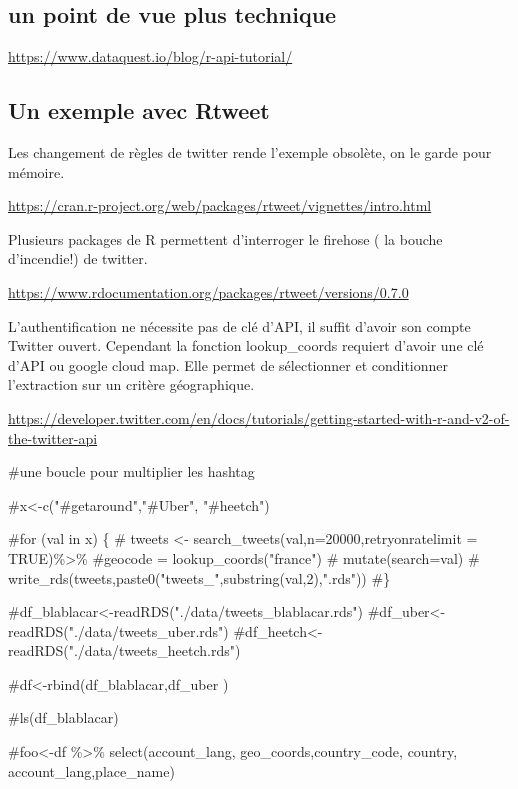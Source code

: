 \documentclass[
  letterpaper,
  DIV=11,
  numbers=noendperiod]{scrreprt}
\newenvironment{Shaded}{\begin{snugshade}}{\end{snugshade}}
\newcommand{\CommentTok}[1]{\textcolor[rgb]{0.37,0.37,0.37}{#1}}
\begin{document}
\subsection{un point de vue plus
technique}\label{un-point-de-vue-plus-technique}

\url{https://www.dataquest.io/blog/r-api-tutorial/}

\subsection{Un exemple avec Rtweet}\label{un-exemple-avec-rtweet}

Les changement de règles de twitter rende l'exemple obsolète, on le
garde pour mémoire.

\url{https://cran.r-project.org/web/packages/rtweet/vignettes/intro.html}

Plusieurs packages de R permettent d'interroger le firehose ( la bouche
d'incendie!) de twitter.

\url{https://www.rdocumentation.org/packages/rtweet/versions/0.7.0}

L'authentification ne nécessite pas de clé d'API, il suffit d'avoir son
compte Twitter ouvert. Cependant la fonction lookup\_coords requiert
d'avoir une clé d'API ou google cloud map. Elle permet de sélectionner
et conditionner l'extraction sur un critère géographique.

\url{https://developer.twitter.com/en/docs/tutorials/getting-started-with-r-and-v2-of-the-twitter-api}

\begin{Shaded}
\begin{Highlighting}[]
\CommentTok{\#une boucle pour multiplier les hashtag }

\CommentTok{\#x\textless{}{-}c("\#getaround","\#Uber", "\#heetch")}

\CommentTok{\#for (val in x) \{}
\CommentTok{\#  tweets \textless{}{-} search\_tweets(val,n=20000,retryonratelimit = TRUE)\%\textgreater{}\% \#geocode = lookup\_coords("france")}
\CommentTok{\#      mutate(search=val)}
\CommentTok{\#  write\_rds(tweets,paste0("tweets\_",substring(val,2),".rds"))}
\CommentTok{\#\}}

\CommentTok{\#df\_blablacar\textless{}{-}readRDS("./data/tweets\_blablacar.rds")}
\CommentTok{\#df\_uber\textless{}{-}readRDS("./data/tweets\_uber.rds")}
\CommentTok{\#df\_heetch\textless{}{-}readRDS("./data/tweets\_heetch.rds")}

\CommentTok{\#df\textless{}{-}rbind(df\_blablacar,df\_uber )}

\CommentTok{\#ls(df\_blablacar)}

\CommentTok{\#foo\textless{}{-}df \%\textgreater{}\% select(account\_lang, geo\_coords,country\_code, country, account\_lang,place\_name)}
\end{Highlighting}
\end{Shaded}
\end{document}
